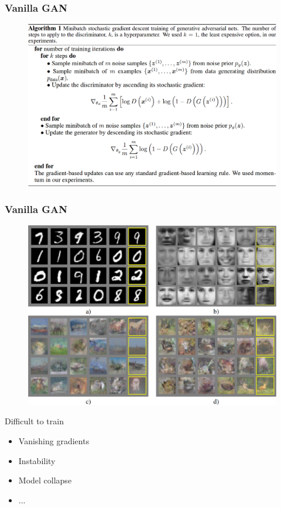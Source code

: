\documentclass{beamer}
\begin{document}
\begin{frame}
\frametitle{Vanilla GAN}
\begin{figure}
  \includegraphics[height=.8\textheight]{GAN_algorithm.png}
\end{figure}
\end{frame}

\begin{frame}
\frametitle{Vanilla GAN}
\begin{figure}
  \includegraphics[height=.5\textheight]{GAN_samples.png}
\end{figure}
Difficult to train \cite{Salimans2016, Arjovsky2017a}
\begin{itemize}
  \item Vanishing gradients
  \item Instability
  \item Model collapse
  \item ...
\end{itemize}
\end{frame}
\end{document}
